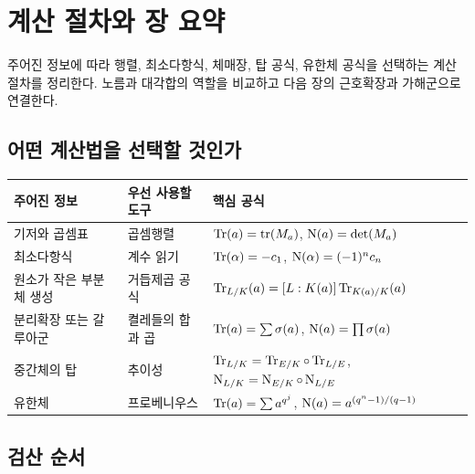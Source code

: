 \clearpage
\section{계산 절차와 장 요약}
\label{sec:norm-trace-workflow-review}

\begin{learninggoal}
주어진 정보에 따라 행렬, 최소다항식, 체매장, 탑 공식, 유한체 공식을 선택하는 계산 절차를 정리한다. 노름과 대각합의 역할을 비교하고 다음 장의 근호확장과 가해군으로 연결한다.
\end{learninggoal}

\subsection{어떤 계산법을 선택할 것인가}

\begin{center}
\renewcommand{\arraystretch}{1.25}
\begin{tabular}{>{\raggedright\arraybackslash}p{}>{\raggedright\arraybackslash}p{}>{\raggedright\arraybackslash}p{}}
\toprule
주어진 정보 & 우선 사용할 도구 & 핵심 공식 \\
\midrule
기저와 곱셈표 &
곱셈행렬 &
$\operatorname{Tr}(a)=\operatorname{tr}(M_a)$,
$\operatorname{N}(a)=\det(M_a)$ \\

최소다항식 &
계수 읽기 &
$\operatorname{Tr}(\alpha)=-c_1$,
$\operatorname{N}(\alpha)=(-1)^n c_n$ \\

원소가 작은 부분체 생성 &
거듭제곱 공식 &
$\operatorname{Tr}_{L/K}(a)=[L:K(a)]\operatorname{Tr}_{K(a)/K}(a)$ \\

분리확장 또는 갈루아군 &
켤레들의 합과 곱 &
$\operatorname{Tr}(a)=\sum\sigma(a)$,
$\operatorname{N}(a)=\prod\sigma(a)$ \\

중간체의 탑 &
추이성 &
$\operatorname{Tr}_{L/K}=\operatorname{Tr}_{E/K}\circ\operatorname{Tr}_{L/E}$,
$\operatorname{N}_{L/K}=\operatorname{N}_{E/K}\circ\operatorname{N}_{L/E}$ \\

유한체 &
프로베니우스 &
$\operatorname{Tr}(a)=\sum a^{q^j}$,
$\operatorname{N}(a)=a^{(q^n-1)/(q-1)}$ \\
\bottomrule
\end{tabular}
\end{center}

\subsection{검산 순서}

